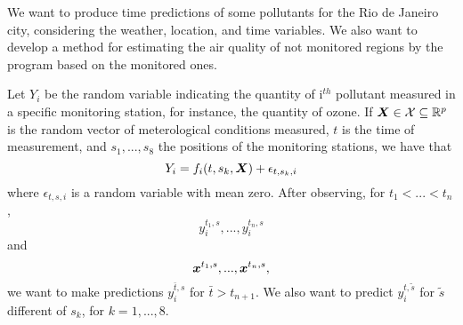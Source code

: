 \BL We want to produce time predictions of some pollutants for the Rio de Janeiro
city, considering the weather, location, and time variables. We also want to
develop a method for estimating the air quality of not monitored regions by
the program based on the monitored ones.

Let $Y_i$ be the random
variable indicating the quantity of i$^{th}$ pollutant measured in a specific
monitoring station, for instance, the quantity of ozone. If $\boldsymbol{X} \in \mathcal{X}
\subseteq \mathbb{R}^{p}$ is the random vector of meterological conditions measured,
$t$ is the time of measurement, and $s_1, ..., s_8$ the positions of the
monitoring stations, we have that 
\begin{equation}
    \label{eq:problem definition}
    Y_i = f_i(t, s_k, \boldsymbol{X}) + \epsilon_{t,s_k,i}
\end{equation}
where $\epsilon_{t,s,i}$ is a random variable with mean zero. After
observing, for $t_1 < ... < t_n$,  
$$y_i^{t_1,s}, ..., y_i^{t_n,s}$$ 
and 
$$
\boldsymbol{x}^{t_1,s}, ..., \boldsymbol{x}^{t_n,s},
$$
we want to make predictions $y_i^{\bar{t},s}$ for $\bar{t} > t_{n+1}$. We also want to
predict $y_i^{t, \tilde{s}}$ for $\tilde{s}$ different of $s_k$, for $k =
1,...,8$. 